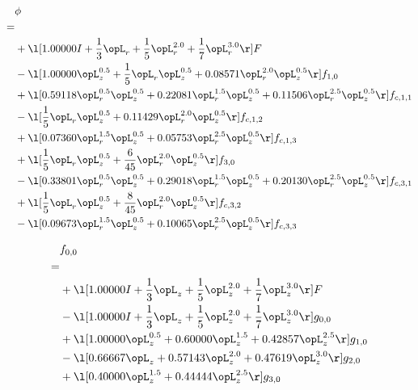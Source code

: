 \begin{alignat}{2} 
\label{eq:scalarFlux_0} 
& \phi \nonumber \\ 
 = \\ 
& + \l[  1.00000 I + \frac{1}{3} \opL_r + \frac{1}{5} \opL_r^{2.0} + \frac{1}{7} \opL_r^{3.0}  \r] F \nonumber \\ 
& - \l[  1.00000 \opL_z^{0.5} + \frac{1}{5} \opL_r \opL_z^{0.5} +  0.08571 \opL_r^{2.0} \opL_z^{0.5}  \r] f_{1,0} \nonumber \\ 
& + \l[  0.59118 \opL_r^{0.5} \opL_z^{0.5} +  0.22081 \opL_r^{1.5} \opL_z^{0.5} +  0.11506 \opL_r^{2.5} \opL_z^{0.5}  \r] f_{c,1,1} \nonumber \\ 
& - \l[ \frac{1}{5} \opL_r \opL_z^{0.5} +  0.11429 \opL_r^{2.0} \opL_z^{0.5}  \r] f_{c,1,2} \nonumber \\ 
& + \l[  0.07360 \opL_r^{1.5} \opL_z^{0.5} +  0.05753 \opL_r^{2.5} \opL_z^{0.5}  \r] f_{c,1,3} \nonumber \\ 
& + \l[ \frac{1}{5} \opL_r \opL_z^{0.5} + \frac{6}{45} \opL_r^{2.0} \opL_z^{0.5}  \r] f_{3,0} \nonumber \\ 
& - \l[  0.33801 \opL_r^{0.5} \opL_z^{0.5} +  0.29018 \opL_r^{1.5} \opL_z^{0.5} +  0.20130 \opL_r^{2.5} \opL_z^{0.5}  \r] f_{c,3,1} \nonumber \\ 
& + \l[ \frac{1}{5} \opL_r \opL_z^{0.5} + \frac{8}{45} \opL_r^{2.0} \opL_z^{0.5}  \r] f_{c,3,2} \nonumber \\ 
& - \l[  0.09673 \opL_r^{1.5} \opL_z^{0.5} +  0.10065 \opL_r^{2.5} \opL_z^{0.5}  \r] f_{c,3,3} \nonumber \\ 
\end{alignat} 


\begin{alignat}{2} 
\label{eq:f_00_0} 
& f_{0,0} \nonumber \\ 
 = \\ 
& + \l[  1.00000 I + \frac{1}{3} \opL_z + \frac{1}{5} \opL_z^{2.0} + \frac{1}{7} \opL_z^{3.0}  \r] F \nonumber \\ 
& - \l[  1.00000 I + \frac{1}{3} \opL_z + \frac{1}{5} \opL_z^{2.0} + \frac{1}{7} \opL_z^{3.0}  \r] g_{0,0} \nonumber \\ 
& + \l[  1.00000 \opL_z^{0.5} +  0.60000 \opL_z^{1.5} +  0.42857 \opL_z^{2.5}  \r] g_{1,0} \nonumber \\ 
& - \l[  0.66667 \opL_z +  0.57143 \opL_z^{2.0} +  0.47619 \opL_z^{3.0}  \r] g_{2,0} \nonumber \\ 
& + \l[  0.40000 \opL_z^{1.5} +  0.44444 \opL_z^{2.5}  \r] g_{3,0} \nonumber \\ 
\end{alignat} 



